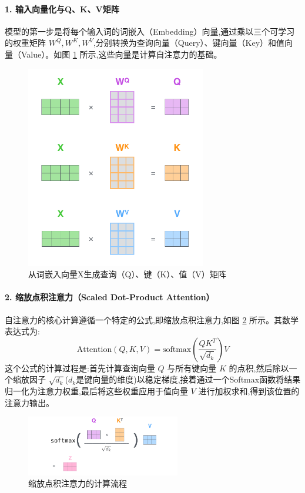 \paragraph{1. 输入向量化与Q、K、V矩阵}
模型的第一步是将每个输入词的词嵌入（Embedding）向量,通过乘以三个可学习的权重矩阵 $W^Q, W^K, W^V$,分别转换为查询向量（Query）、键向量（Key）和值向量（Value）。如图 \ref{fig:qkv_creation} 所示,这些向量是计算自注意力的基础。
\begin{figure}[htbp]
    \centering
    \includegraphics[width=0.7\textwidth]{figures/T1.png}
    \caption{从词嵌入向量X生成查询（Q）、键（K）、值（V）矩阵}
    \label{fig:qkv_creation}
\end{figure}

\paragraph{2. 缩放点积注意力（Scaled Dot-Product Attention）}
自注意力的核心计算遵循一个特定的公式,即缩放点积注意力,如图 \ref{fig:scaled_dot_product} 所示。其数学表达式为:
$$ \text{Attention}(Q, K, V) = \text{softmax}\left(\frac{QK^T}{\sqrt{d_k}}\right)V $$
这个公式的计算过程是:首先计算查询向量 $Q$ 与所有键向量 $K$ 的点积,然后除以一个缩放因子 $\sqrt{d_k}$($d_k$是键向量的维度)以稳定梯度,接着通过一个Softmax函数将结果归一化为注意力权重,最后将这些权重应用于值向量 $V$ 进行加权求和,得到该位置的注意力输出。
\begin{figure}[H]
    \centering
    \includegraphics[width=0.6\textwidth]{figures/T2.png}
    \caption{缩放点积注意力的计算流程}
    \label{fig:scaled_dot_product}
\end{figure}

